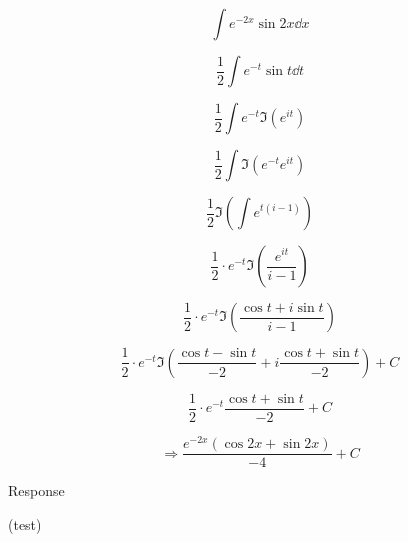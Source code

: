 \documentclass[11pt]{article}
\newcommand{\br}[1]{(#1)}
\begin{document}
$$\int e^{-2x}\sin{2x}\dd{x} $$

$$ \frac12 \int e^{-t} \sin{t}\dd{t} $$

$$ \frac12 \int e^{-t} \Im(e^{it}) $$

$$ \frac12 \int \Im(e^{-t}e^{it}) $$

$$ \frac12 \Im\left(\int e^{t(i-1)}\right) $$

$$  \frac12 \cdot e^{-t} \Im\left(\frac{e^{it}}{i-1}\right) $$

$$ \frac12 \cdot e^{-t} \Im\left(\frac{\cos{t} + i\sin{t}}{i-1}\right) $$

$$ \frac12 \cdot e^{-t} \Im\left(\frac{\cos{t}-\sin{t}}{-2} + i\frac{\cos{t} + \sin{t}}{-2}\right) + C $$

$$ \frac12 \cdot e^{-t}\frac{\cos{t} + \sin{t}}{-2} + C $$

$$\Longrightarrow \frac{e^{-2x}(\cos{2x} + \sin{2x})}{-4} + C $$

\begin{figure}[h]
\centering
\end{figure}

Response

\br{test}
\end{document}
